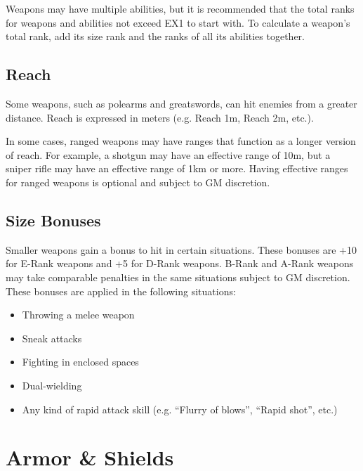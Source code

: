 \begin{multicols}{2}
Weapons may have multiple abilities, but it is recommended that the total ranks for weapons and abilities not exceed EX1 to start with. To calculate a weapon's total rank, add its size rank and the ranks of all its abilities together.


\subsection{Reach}
Some weapons, such as polearms and greatswords, can hit enemies from a greater distance. Reach is expressed in meters (e.g. Reach 1m, Reach 2m, etc.).

In some cases, ranged weapons may have ranges that function as a longer version of reach. For example, a shotgun may have an effective range of 10m, but a sniper rifle may have an effective range of 1km or more. Having effective ranges for ranged weapons is optional and subject to GM discretion.

\subsection{Size Bonuses}
Smaller weapons gain a bonus to hit in certain situations. These bonuses are +10 for E-Rank weapons and +5 for D-Rank weapons. B-Rank and A-Rank weapons may take comparable penalties in the same situations subject to GM discretion. These bonuses are applied in the following situations:
\begin{itemize}
\item Throwing a melee weapon
\item Sneak attacks
\item Fighting in enclosed spaces
\item Dual-wielding
\item Any kind of rapid attack skill (e.g. “Flurry of blows”, “Rapid shot”, etc.)
\end{itemize}


\section{Armor \& Shields}


\end{multicols}
